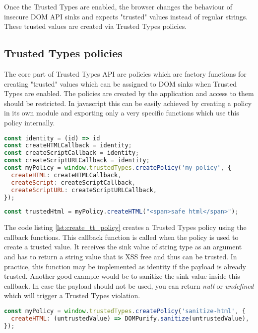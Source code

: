 Once the Trusted Types are enabled, the browser changes the behaviour of insecure DOM API sinks and
expects "trusted" values instead of regular strings. These trusted values are created via Trusted
Types policies.

\subsection{Trusted Types policies}
\label{subsec:tt_policy}

The core part of Trusted Types API are policies which are factory functions for creating "trusted"
values which can be assigned to DOM sinks when Trusted Types are enabled. The policies are created
by the application and access to them should be restricted. In javascript this can be easily
achieved by creating a policy in its own module and exporting only a very specific functions which
use this policy internally.

\bigskip
\begin{lstlisting}[language=JavaScript, caption=Creating Trusted Types policy, label={lst:create_tt_policy}]
const identity = (id) => id
const createHTMLCallback = identity;
const createScriptCallback = identity;
const createScriptURLCallback = identity;
const myPolicy = window.trustedTypes.createPolicy('my-policy', {
  createHTML: createHTMLCallback,
  createScript: createScriptCallback,
  createScriptURL: createScriptURLCallback,
});
\end{lstlisting}

\bigskip
\begin{lstlisting}[language=JavaScript, caption=Create trusted value using a policy]
const trustedHtml = myPolicy.createHTML("<span>safe html</span>");
\end{lstlisting}

The code listing \ref{lst:create_tt_policy} creates a Trusted Types policy using the callback
functions. This callback function is called when the policy is used to create a trusted value. It
receives the sink value of string type as an argument and has to return a string value that is XSS
free and thus can be trusted. In practice, this function may be implemented as identity if the
payload is already trusted. Another good example would be to sanitize the sink value inside this
callback. In case the payload should not be used, you can return \textit{null} or \textit{undefined}
which will trigger a Trusted Types violation.

\bigskip
\begin{lstlisting}[language=JavaScript, caption=Using a policy to sanitize HTML values]
const myPolicy = window.trustedTypes.createPolicy('sanitize-html', {
  createHTML: (untrustedValue) => DOMPurify.sanitize(untrustedValue),
});
\end{lstlisting}

